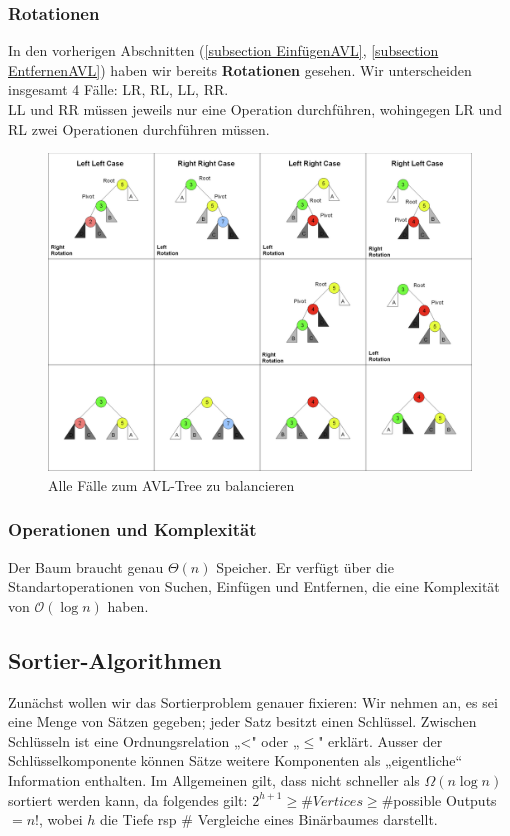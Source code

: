 \documentclass[a4paper]{article}
\begin{document}
\newpage


\subsubsection{Rotationen} \label{Rotationsabschnitt}
In den vorherigen Abschnitten (\ref{subsection EinfügenAVL}, \ref{subsection EntfernenAVL}) haben wir bereits \textbf{Rotationen} gesehen. Wir unterscheiden insgesamt 4 Fälle: LR, RL, LL, RR. \\
LL und RR müssen jeweils nur eine Operation durchführen, wohingegen LR und RL zwei Operationen durchführen müssen. 

\begin{figure}[h]
    \centering
    \includegraphics[scale = 0.4]{Pictures/AVL-Rotations.png}
    \caption{Alle Fälle zum AVL-Tree zu balancieren}
    \label{fig:AVL-rotations}
\end{figure}

\subsubsection{Operationen und Komplexität}
    Der Baum braucht genau $\Theta (n)$ Speicher. Er verfügt über die Standartoperationen von Suchen, Einfügen und Entfernen, die eine Komplexität von $\mathcal{O}(\log n)$ haben. 


\subsection{Sortier-Algorithmen}
Zunächst wollen wir das Sortierproblem genauer fixieren: Wir nehmen an, es sei eine
Menge von Sätzen gegeben; jeder Satz besitzt einen Schlüssel. Zwischen Schlüsseln ist
eine Ordnungsrelation „<" oder „$\leq$" erklärt. Ausser der Schlüsselkomponente können
Sätze weitere Komponenten als „eigentliche“ Information enthalten. Im Allgemeinen gilt, dass nicht schneller als $\Omega(n\log n)$ sortiert werden kann, da folgendes gilt: $2^{h+1} \geq \#Vertices \geq \#$possible Outputs $= n!$, wobei $h$ die Tiefe rsp \# Vergleiche eines Binärbaumes darstellt.
\end{document}
